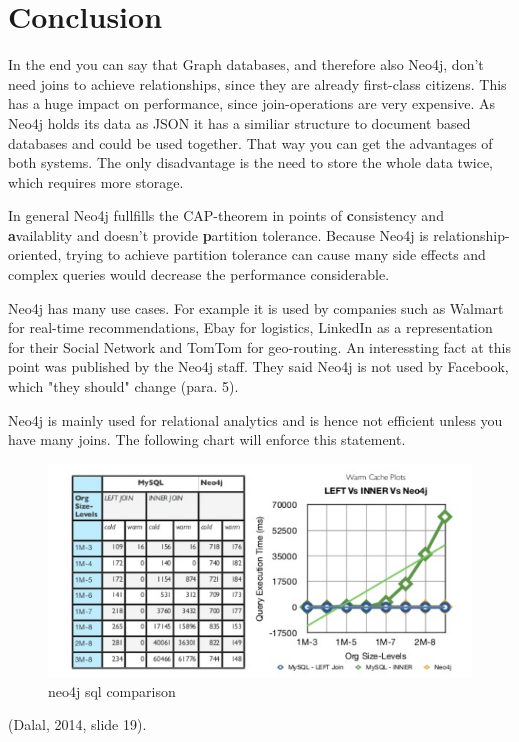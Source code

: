 \section{Conclusion}

In the end you can say that Graph databases, and therefore also Neo4j, don't need joins to achieve relationships, since they are already first-class citizens. This has a huge impact on performance, since join-operations are very expensive.
As Neo4j holds its data as JSON it has a similiar structure to document based databases and could be used together. That way you can get the advantages of both systems. The only disadvantage is the need to store the whole data twice, which requires more storage.

In general Neo4j fullfills the CAP-theorem in points of \textbf{c}onsistency and \textbf{a}vailablity and doesn't provide \textbf{p}artition tolerance. Because Neo4j is relationship-oriented, trying to achieve partition tolerance can cause many side effects and complex queries would decrease the performance considerable.

Neo4j has many use cases. For example it is used by companies such as Walmart for real-time recommendations, Ebay for logistics, LinkedIn as a representation for their Social Network and TomTom for geo-routing. An interessting fact at this point was published by the Neo4j staff. They said Neo4j is not used by Facebook, which "they should" change \cite{Neo4jStaff.2011} (para. 5).

Neo4j is mainly used for relational analytics and is hence not efficient unless you have many joins. The following chart will enforce this statement.

\begin{figure}[H]
	\includegraphics[width=\linewidth,keepaspectratio]{images/neo4j/neo4j_joins.png}
	\caption{neo4j sql comparison}
\end{figure}  
\cite{Dalal.2014} (Dalal, 2014, slide 19).

